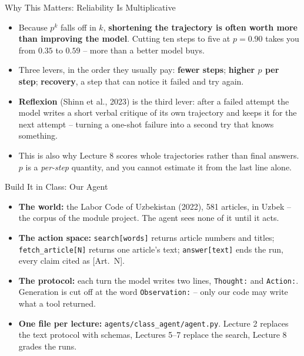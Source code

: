\begin{frame}{Why This Matters: Reliability Is Multiplicative}
\begin{itemize}
  \item Because $p^{k}$ falls off in $k$, \textbf{shortening the trajectory is often worth more than improving the model}. Cutting ten steps to five at $p=0.90$ takes you from $0.35$ to $0.59$ -- more than a better model buys.
  \pause
  \item Three levers, in the order they usually pay: \textbf{fewer steps}; \textbf{higher $p$ per step}; \textbf{recovery}, a step that can notice it failed and try again.
  \pause
  \item \textbf{Reflexion} (Shinn et al., 2023) is the third lever: after a failed attempt the model writes a short verbal critique of its own trajectory and keeps it for the next attempt -- turning a one-shot failure into a second try that knows something.
  \pause
  \item This is also why Lecture 8 scores whole trajectories rather than final answers. $p$ is a \emph{per-step} quantity, and you cannot estimate it from the last line alone.
\end{itemize}
\end{frame}

\begin{frame}{Build It in Class: Our Agent}
\begin{itemize}
  \item \textbf{The world:} the Labor Code of Uzbekistan (2022), 581 articles, in Uzbek -- the corpus of the module project. The agent sees none of it until it acts.
  \pause
  \item \textbf{The action space:} \texttt{search[words]} returns article numbers and titles; \texttt{fetch\_article[N]} returns one article's text; \texttt{answer[text]} ends the run, every claim cited as [Art.~N].
  \pause
  \item \textbf{The protocol:} each turn the model writes two lines, \texttt{Thought:} and \texttt{Action:}. Generation is cut off at the word \texttt{Observation:} -- only our code may write what a tool returned.
  \pause
  \item \textbf{One file per lecture:} \texttt{agents/class\_agent/agent.py}. Lecture 2 replaces the text protocol with schemas, Lectures 5--7 replace the search, Lecture 8 grades the runs.
\end{itemize}
\end{frame}


